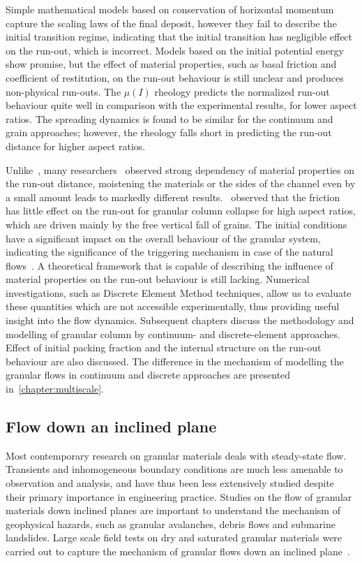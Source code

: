 Simple mathematical models based on conservation of horizontal momentum capture 
the scaling laws of the final deposit, however they fail to describe the 
initial transition regime, indicating that the initial transition has 
negligible effect on the run-out, which is incorrect. Models based on the 
initial potential energy show promise, but the effect of material properties, 
such as basal friction and coefficient of restitution, on the run-out behaviour 
is still unclear and produces non-physical run-outs. The $\mu(\textit{I})$ 
rheology predicts the normalized run-out behaviour quite well in comparison 
with the experimental results, for lower aspect ratios. The spreading dynamics 
is found to be similar for the continuum and grain approaches; however, the 
rheology falls short in predicting the run-out distance for higher aspect 
ratios. 

Unlike~\citet{Lube2005}, many 
researchers~\citep{Balmforth2005,Kerswell2005} observed strong dependency of 
material properties on the run-out distance, moistening the materials or the 
sides of the channel even by a small amount leads to markedly different 
results.~\citet{Staron2007a} observed that the friction has little effect on 
the run-out for granular column collapse for high aspect ratios, which are 
driven mainly by the free vertical fall of grains. The initial conditions have 
a significant impact on the overall behaviour of the granular system, 
indicating the significance of the triggering mechanism in case of the natural 
flows~\citep{Staron2007a}. A theoretical framework that is capable of 
describing the influence of material properties on the run-out behaviour is 
still lacking. Numerical investigations, such as Discrete Element 
Method techniques, allow us to evaluate these quantities which are not 
accessible experimentally, thus providing useful insight into the flow 
dynamics. Subsequent chapters discuss the methodology and modelling of granular 
column by continuum- and discrete-element approaches. Effect of initial packing 
fraction and the internal structure on the run-out behaviour are also 
discussed. The difference in the mechanism of modelling the granular flows in 
continuum and discrete approaches are presented in~\cref{chapter:multiscale}.

\subsection{Flow down an inclined plane}

Most contemporary research on granular materials deals
with steady-state flow. Transients and inhomogeneous boundary conditions 
are much less amenable to observation and analysis, and have thus been less 
extensively studied despite their primary importance in engineering practice. 
Studies on the flow of granular materials down inclined planes are important to 
understand the mechanism of geophysical hazards, such as granular avalanches, 
debris flows and submarine landslides. Large scale field tests on dry and 
saturated granular materials were carried out to capture the mechanism of 
granular flows down an inclined plane~\citep{Okada2008,Denlinger2001}.


